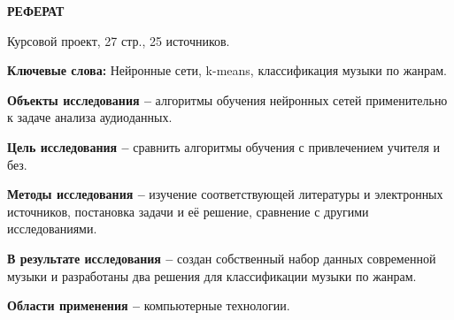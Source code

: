 \begin{center}
  \large\bfseries{РЕФЕРАТ}
\end{center}

Курсовой проект, 27 стр., 25 источников.

\textbf{Ключевые слова:} Нейронные сети, k-means, классификация музыки по жанрам.

\textbf{Объекты исследования --} алгоритмы обучения нейронных сетей применительно к задаче анализа аудиоданных.

\textbf{Цель исследования --} сравнить алгоритмы обучения с привлечением учителя и без.

\textbf{Методы исследования --} изучение соответствующей литературы и электронных источников, постановка задачи и её решение, сравнение с другими исследованиями.

\textbf{В результате исследования --} создан собственный набор данных современной музыки и разработаны два решения для классификации музыки по жанрам.

\textbf{Области применения --} компьютерные технологии.

\newpage